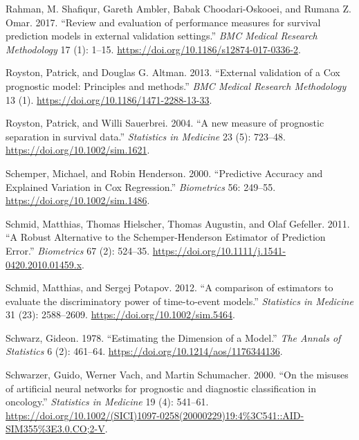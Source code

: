 \documentclass[
  letterpaper,
]{scrbook}
\newlength{\cslhangindent}
\newlength{\cslentryspacingunit} %
\newenvironment{CSLReferences}[2] %
 {%
  \setlength{\parindent}{0pt}
  \ifodd #1
  \let\oldpar\par
  \def\par{\hangindent=\cslhangindent\oldpar}
  \fi
  \setlength{\parskip}{#2\cslentryspacingunit}
 }%
 {}
\theoremstyle{plain}
\theoremstyle{definition}
\theoremstyle{remark}
\begin{document}
\begin{CSLReferences}{1}{0}
\leavevmode{}%
Rahman, M. Shafiqur, Gareth Ambler, Babak Choodari-Oskooei, and Rumana
Z. Omar. 2017. {``{Review and evaluation of performance measures for
survival prediction models in external validation settings}.''}
\emph{BMC Medical Research Methodology} 17 (1): 1--15.
\url{https://doi.org/10.1186/s12874-017-0336-2}.

\leavevmode{}%
Royston, Patrick, and Douglas G. Altman. 2013. {``{External validation
of a Cox prognostic model: Principles and methods}.''} \emph{BMC Medical
Research Methodology} 13 (1).
\url{https://doi.org/10.1186/1471-2288-13-33}.

\leavevmode{}%
Royston, Patrick, and Willi Sauerbrei. 2004. {``{A new measure of
prognostic separation in survival data}.''} \emph{Statistics in
Medicine} 23 (5): 723--48. \url{https://doi.org/10.1002/sim.1621}.

\leavevmode{}%
Schemper, Michael, and Robin Henderson. 2000. {``{Predictive Accuracy
and Explained Variation in Cox Regression}.''} \emph{Biometrics} 56:
249--55. \url{https://doi.org/10.1002/sim.1486}.

\leavevmode{}%
Schmid, Matthias, Thomas Hielscher, Thomas Augustin, and Olaf Gefeller.
2011. {``{A Robust Alternative to the Schemper-Henderson Estimator of
Prediction Error}.''} \emph{Biometrics} 67 (2): 524--35.
\url{https://doi.org/10.1111/j.1541-0420.2010.01459.x}.

\leavevmode{}%
Schmid, Matthias, and Sergej Potapov. 2012. {``{A comparison of
estimators to evaluate the discriminatory power of time-to-event
models}.''} \emph{Statistics in Medicine} 31 (23): 2588--2609.
\url{https://doi.org/10.1002/sim.5464}.

\leavevmode{}%
Schwarz, Gideon. 1978. {``{Estimating the Dimension of a Model}.''}
\emph{The Annals of Statistics} 6 (2): 461--64.
\url{https://doi.org/10.1214/aos/1176344136}.

\leavevmode{}%
Schwarzer, Guido, Werner Vach, and Martin Schumacher. 2000. {``{On the
misuses of artificial neural networks for prognostic and diagnostic
classification in oncology}.''} \emph{Statistics in Medicine} 19 (4):
541--61.
\url{https://doi.org/10.1002/(SICI)1097-0258(20000229)19:4\%3C541::AID-SIM355\%3E3.0.CO;2-V}.


\end{CSLReferences}
\end{document}
